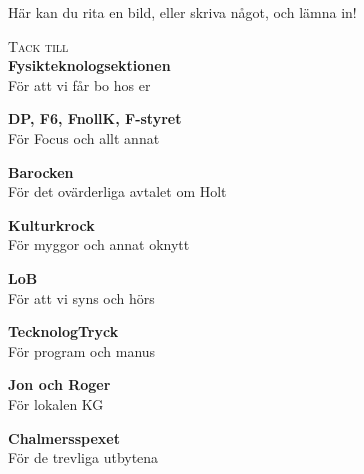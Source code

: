 \begin{paracol}{2}
    \vspace*{\baselineskip}
    {\hfill }\vfill{\noindent Här kan du rita en bild, eller skriva något, och lämna in!}
    
    \switchcolumn
    
    {\HUGE \textsc{Tack till}}
    \leavevmode\\
    
    \noindent\textbf{Fysikteknologsektionen}\\
    För att vi får bo hos er\leavevmode\\
    \vspace*{-0.3\baselineskip}

    \noindent\textbf{DP, F6, FnollK, F-styret}\\
    För Focus och allt annat\leavevmode\\
    \vspace*{-0.3\baselineskip}
    
    \noindent\textbf{Barocken}\\
    För det ovärderliga avtalet om Holt\leavevmode\\   \vspace*{-0.3\baselineskip}
    
    \noindent\textbf{Kulturkrock}\\
    För myggor och annat oknytt\leavevmode\\    \vspace*{-0.3\baselineskip}

    \noindent\textbf{LoB}\\
    För att vi syns och hörs\leavevmode\\    \vspace*{-0.3\baselineskip}

    \noindent\textbf{TecknologTryck}\\
    För program och manus\leavevmode\\    \vspace*{-0.3\baselineskip}

    \noindent\textbf{Jon och Roger}\\
    För lokalen KG\leavevmode\\    
    \vspace*{-0.3\baselineskip}

    \noindent\textbf{Chalmersspexet}\\
    För de trevliga utbytena\leavevmode\\     \vspace*{-0.3\baselineskip}


\end{paracol}
